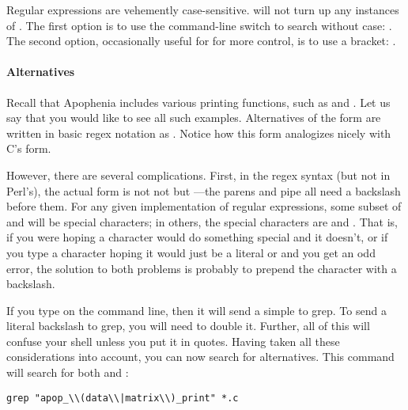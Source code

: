 Regular expressions are vehemently case-sensitive.  will not turn up any instances of . The first
option is to use the  command-line switch to search without case:
. The second option, occasionally useful
for for more control, is to use a bracket: .

\paragraph{Alternatives} 
Recall that Apophenia includes various printing functions, such as
 and . Let us say that you
would like to see all such examples. Alternatives of the form  are written in basic regex notation as . Notice how this
form analogizes nicely with C's  form.

However, there are several complications. First, in the
 regex syntax (but not in Perl's), the actual form is not
not  but ---the
parens and pipe all need a backslash before them. For any given
implementation of regular expressions, some subset of 
and \ci{\}} will be special characters; in others, the special characters are
 and \ci{\textbs\}}.
That is, if you were hoping a character would do something special and it
doesn't,  or if you type a character hoping
it would just be a literal \ci{+} or \ci{|} and you get an odd error,
the solution to both problems is probably to prepend the character with a backslash.

If you type \ci{$\backslash$|} on the command line, then it will send a
simple \ci{|} to grep. To send a literal backslash to grep, you will
need to double it. Further, all of this will confuse your shell unless
you put it in quotes. Having taken all these considerations into
account, you can now search for alternatives. This command will search
for both  and :
\begin{lstlisting}
grep "apop_\\(data\\|matrix\\)_print" *.c
\end{lstlisting}

